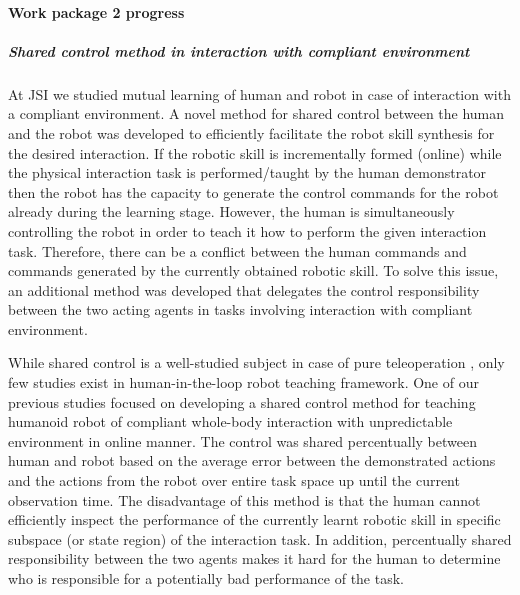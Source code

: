 \paragraph{Work package 2 progress}

\subparagraph*{Shared control method in interaction with compliant environment}
At JSI we studied mutual learning of human and robot in case of interaction with a compliant environment. A novel method for shared control between the human and the robot was developed to efficiently facilitate the robot skill synthesis for the desired interaction. If the robotic skill is incrementally formed (online) while the physical interaction task is performed/taught by the human demonstrator then the robot has the capacity to generate the control commands for the robot already during the learning stage. However, the human is simultaneously controlling the robot in order to teach it how to perform the given interaction task. Therefore, there can be a conflict between the human commands and commands generated by the currently obtained robotic skill. To solve this issue, an additional method was developed that delegates the control responsibility between the two acting agents in tasks involving interaction with compliant environment.

While shared control is a well-studied subject in case of pure teleoperation \cite{Niemeyer2008}, only few studies exist in human-in-the-loop robot teaching framework. One of our previous studies \cite{Peternel2013} focused on developing a shared control method for teaching humanoid robot of compliant whole-body interaction with unpredictable environment in online manner. The control was shared percentually between human and robot based on the average error between the demonstrated actions and the actions from the robot over entire task space up until the current observation time. The disadvantage of this method is that the human cannot efficiently inspect the performance of the currently learnt robotic skill in specific subspace (or state region) of the interaction task. In addition, percentually shared responsibility between the two agents makes it hard for the human to determine who is responsible for a potentially bad performance of the task.

